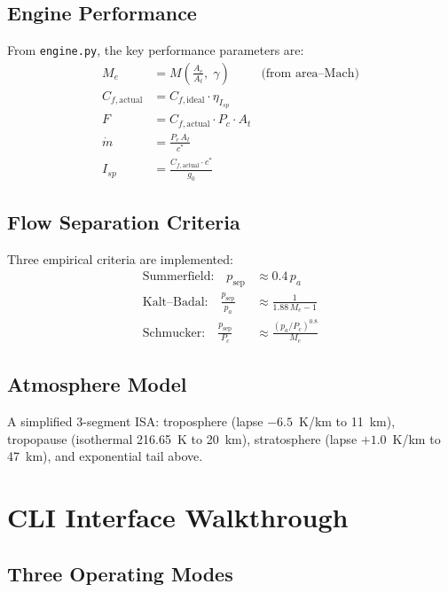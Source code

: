 \documentclass[11pt,a4paper]{article}
\begin{document}
\subsection{Engine Performance}

From \texttt{engine.py}, the key performance parameters are:
\begin{align}
M_e &= M\!\left(\frac{A_e}{A_t},\;\gamma\right) & \text{(from area--Mach)} \\
C_{f,\text{actual}} &= C_{f,\text{ideal}}\cdot\eta_{I_{sp}} \\
F &= C_{f,\text{actual}}\cdot P_c\cdot A_t \\
\dot{m} &= \frac{P_c\,A_t}{c^*} \\
I_{sp} &= \frac{C_{f,\text{actual}}\cdot c^*}{g_0}
\end{align}

\subsection{Flow Separation Criteria}

Three empirical criteria are implemented:
\begin{align}
\text{Summerfield:} \quad p_{\text{sep}} &\approx 0.4\,p_a \\
\text{Kalt--Badal:} \quad \frac{p_{\text{sep}}}{p_a} &\approx \frac{1}{1.88\,M_e - 1} \\
\text{Schmucker:} \quad \frac{p_{\text{sep}}}{P_c} &\approx \frac{(p_a/P_c)^{0.8}}{M_e}
\end{align}

\subsection{Atmosphere Model}

A simplified 3-segment ISA: troposphere (lapse $-6.5$~K/km to 11~km), tropopause (isothermal 216.65~K to 20~km), stratosphere (lapse $+1.0$~K/km to 47~km), and exponential tail above.

\section{CLI Interface Walkthrough}

\subsection{Three Operating Modes}
\end{document}

